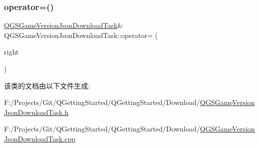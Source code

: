 \subsubsection{\texorpdfstring{operator=()}{operator=()}\hspace{0.1cm}{\footnotesize\ttfamily [2/2]}}
{\footnotesize\ttfamily \mbox{\hyperlink{class_q_g_s_game_version_json_download_task}{Q\+G\+S\+Game\+Version\+Json\+Download\+Task}}\& Q\+G\+S\+Game\+Version\+Json\+Download\+Task\+::operator= (\begin{DoxyParamCaption}\item[{\mbox{\hyperlink{class_q_g_s_game_version_json_download_task}{Q\+G\+S\+Game\+Version\+Json\+Download\+Task}} \&\&}]{right }\end{DoxyParamCaption})\hspace{0.3cm}{\ttfamily [delete]}}



该类的文档由以下文件生成\+:\begin{DoxyCompactItemize}
\item 
F\+:/\+Projects/\+Git/\+Q\+Getting\+Started/\+Q\+Getting\+Started/\+Download/\mbox{\hyperlink{_q_g_s_game_version_json_download_task_8h}{Q\+G\+S\+Game\+Version\+Json\+Download\+Task.\+h}}\item 
F\+:/\+Projects/\+Git/\+Q\+Getting\+Started/\+Q\+Getting\+Started/\+Download/\mbox{\hyperlink{_q_g_s_game_version_json_download_task_8cpp}{Q\+G\+S\+Game\+Version\+Json\+Download\+Task.\+cpp}}\end{DoxyCompactItemize}
